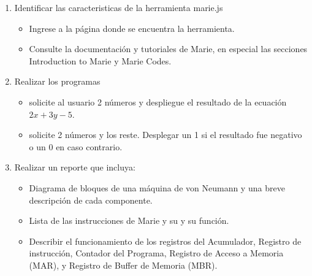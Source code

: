 \documentclass[12pt]{article}
\begin{document}
\begin{enumerate}
\item Identificar las caracteristicas de la herramienta marie.js
\begin{itemize}
\item Ingrese a la página donde se encuentra la herramienta.
\item Consulte la documentación y tutoriales de Marie, en especial las secciones Introduction to Marie y Marie Codes.
\end{itemize}

\item Realizar los programas
\begin{itemize}
\item solicite al usuario 2 números y despliegue el resultado de la ecuación \(2x+3y-5\).
\item solicite 2 números y los reste. Desplegar un 1 si el resultado fue negativo o un 0 en caso contrario.
\end{itemize}

\item Realizar un reporte que incluya: 
\begin{itemize}
\item Diagrama de bloques de una máquina de von Neumann y una breve descripción de cada componente.
\item Lista de las instrucciones de Marie y su y su función.
\item Describir el funcionamiento de los registros del Acumulador, Registro de instrucción, Contador del Programa, Registro de Acceso a Memoria (MAR), y Registro de Buffer de Memoria (MBR).
\end{itemize}
\end{enumerate}

\pagebreak
\end{document}
